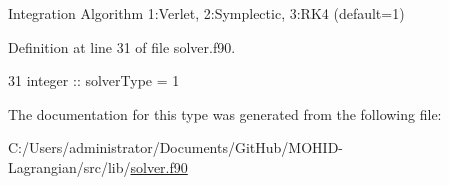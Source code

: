 Integration Algorithm 1\+:Verlet, 2\+:Symplectic, 3\+:R\+K4 (default=1) 



Definition at line 31 of file solver.\+f90.


\begin{DoxyCode}
31         \textcolor{keywordtype}{integer} :: solverType = 1
\end{DoxyCode}


The documentation for this type was generated from the following file\+:\begin{DoxyCompactItemize}
\item 
C\+:/\+Users/administrator/\+Documents/\+Git\+Hub/\+M\+O\+H\+I\+D-\/\+Lagrangian/src/lib/\mbox{\hyperlink{solver_8f90}{solver.\+f90}}\end{DoxyCompactItemize}
